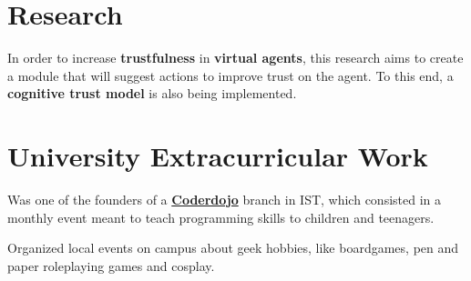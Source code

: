 \documentclass[letterpaper]{deedy-resume} %
\begin{document}
\begin{minipage}[t]{0.64\textwidth}
\sectionspace %



\section{Research}


In order to increase \textbf{trustfulness} in \textbf{virtual agents}, this research aims to create a module that will suggest actions to improve trust on the agent. To this end, a \textbf{cognitive trust model} is also being implemented.


\sectionspace %


\section{University Extracurricular Work}


Was one of the founders of a \textbf{\href{https://coderdojo.com/}{Coderdojo}} branch in IST, which consisted in a monthly event meant to teach programming skills to children and teenagers.

\sectionspace %



Organized local events on campus about geek hobbies, like boardgames, pen and paper roleplaying games and cosplay.

\sectionspace %





\end{minipage} %
\end{document}
